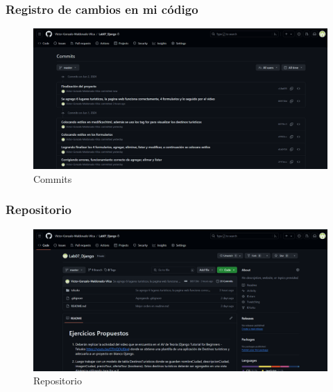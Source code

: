 \documentclass{article}
\begin{document}

	\subsubsection{Registro de cambios en mi código}
  \begin{figure}[H]
    \centering
    \includegraphics[width=1\textwidth, keepaspectratio]{img/commits.png}
    \caption{Commits}
  \end{figure}
  \newpage
	

	\subsubsection{Repositorio}
  \begin{figure}[H]
    \centering
    \includegraphics[width=1\textwidth, keepaspectratio]{img/repositorio.png}
    \caption{Repositorio}
  \end{figure}
  
\end{document}
